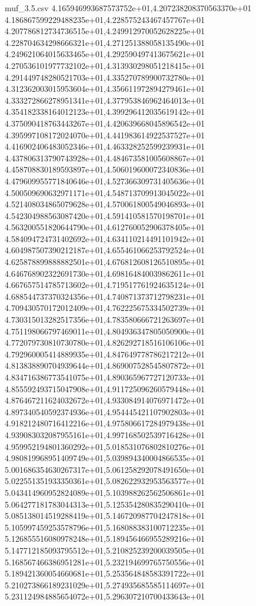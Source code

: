 \begin{filecontents*}{muf_3.5.csv}
4.165946993687573752e+01,4.207238208370563370e+01
4.186867599229488235e+01,4.228575243467457767e+01
4.207786812734736515e+01,4.249912970052628225e+01
4.228704634298666321e+01,4.271251388058135490e+01
4.249621064015633465e+01,4.292590497413675621e+01
4.270536101977732102e+01,4.313930298051218415e+01
4.291449748280521703e+01,4.335270789900732780e+01
4.312362003015953604e+01,4.356611972894279461e+01
4.333272866278951341e+01,4.377953846962464013e+01
4.354182338164012123e+01,4.399296412035619142e+01
4.375090418763443267e+01,4.420639668045896542e+01
4.395997108172024070e+01,4.441983614922537527e+01
4.416902406483052346e+01,4.463328252599239931e+01
4.437806313790743928e+01,4.484673581005608867e+01
4.458708830189593897e+01,4.506019600072340836e+01
4.479609955771840646e+01,4.527366309731405636e+01
4.500509690632971171e+01,4.548713709913045022e+01
4.521408034865079628e+01,4.570061800549046893e+01
4.542304988563087420e+01,4.591410581570198701e+01
4.563200551820644790e+01,4.612760052906378405e+01
4.584094724731402692e+01,4.634110214491101942e+01
4.604987507390212187e+01,4.655461066253792524e+01
4.625878899888882501e+01,4.676812608126510895e+01
4.646768902322691730e+01,4.698164840039862611e+01
4.667657514785713602e+01,4.719517761924635124e+01
4.688544737370324356e+01,4.740871373712798231e+01
4.709430570172012409e+01,4.762225675334502739e+01
4.730315013282517356e+01,4.783580666721263697e+01
4.751198066797469011e+01,4.804936347805050900e+01
4.772079730810730780e+01,4.826292718516106106e+01
4.792960005414889935e+01,4.847649778786217212e+01
4.813838890704939644e+01,4.869007528545807872e+01
4.834716386773541075e+01,4.890365967727120733e+01
4.855592493715047908e+01,4.911725096260579448e+01
4.876467211624032672e+01,4.933084914076971472e+01
4.897340540592374936e+01,4.954445421107902803e+01
4.918212480716412216e+01,4.975806617284979438e+01
4.939083032087955161e+01,4.997168502539716428e+01
4.959952194801360292e+01,5.018531076802810276e+01
4.980819968951409749e+01,5.039894340004866535e+01
5.001686354630267317e+01,5.061258292078491650e+01
5.022551351933350361e+01,5.082622932953563577e+01
5.043414960952824089e+01,5.103988262562506861e+01
5.064277181783044313e+01,5.125354280835290410e+01
5.085138014519288419e+01,5.146720987704247818e+01
5.105997459253578796e+01,5.168088383100712235e+01
5.126855516080978248e+01,5.189456466955289216e+01
5.147712185093795512e+01,5.210825239200039505e+01
5.168567466386951281e+01,5.232194699765750556e+01
5.189421360054660681e+01,5.253564848583391722e+01
5.210273866189231029e+01,5.274935685585114697e+01
5.231124984885654072e+01,5.296307210700433643e+01

\end{filecontents*}
